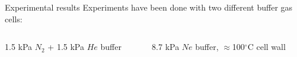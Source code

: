 \begin{block}{Experimental results}
  Experiments have been done with two different buffer gas cells:
  \begin{columns}
    \begin{column}{.49\textwidth}
      \begin{center}
      \begin{figure}
        \setlength\fboxsep{0pt}
        \setlength\fboxrule{0.5pt}
      \end{figure}
      1.5 kPa $N_2$ + 1.5 kPa $He$ buffer
      \end{center}
    \end{column}
    \begin{column}{.49\textwidth}
      \begin{center}
      \begin{figure}
        \setlength\fboxsep{0pt}
        \setlength\fboxrule{0.5pt}
      \end{figure}
      8.7 kPa $Ne$ buffer, $\approx$100$^\circ$C cell wall

\end{center}
\end{column}
\end{columns}
\end{block}
